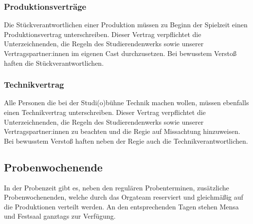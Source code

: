 \subsubsection{Produktionsverträge}
Die Stückverantwortlichen einer Produktion müssen zu Beginn der Spielzeit einen Produktionsvertrag unterschreiben. Dieser Vertrag verpflichtet die Unterzeichnenden, die Regeln des Studierendenwerks sowie unserer Vertragspartner:innen im eigenen Cast durchzusetzen. Bei bewusstem Verstoß haften die Stückverantwortlichen.

\subsubsection{Technikvertrag}
Alle Personen die bei der Studi(o)bühne Technik machen wollen, müssen ebenfalls einen Technikvertrag unterschreiben. Dieser Vertrag verpflichtet die Unterzeichnenden, die Regeln des Studierendenwerks sowie unserer Vertragspartner:innen zu beachten und die Regie auf Missachtung hinzuweisen. Bei bewusstem Verstoß haften neben der Regie auch die Technikverantwortlichen.

\subsection{Probenwochenende}
In der Probenzeit gibt es, neben den regulären Probenterminen, zusätzliche Probenwochenenden, welche durch das Orgateam reserviert und gleichmäßig auf die Produktionen verteilt werden. An den entsprechenden Tagen stehen Mensa und Festsaal ganztags zur Verfügung.

